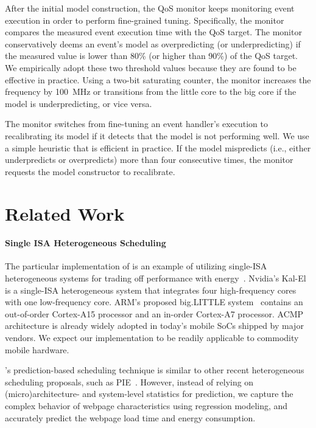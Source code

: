 After the initial model construction, the QoS monitor keeps monitoring event execution in order to perform fine-grained tuning. Specifically, the monitor compares the measured event execution time with the QoS target. The monitor conservatively deems an event's model as overpredicting (or underpredicting) if the measured value is lower than 80\% (or higher than 90\%) of the QoS target. We empirically adopt these two threshold values because they are found to be effective in practice. Using a two-bit saturating counter, the monitor increases the frequency by 100~MHz or transitions from the little core to the big core if the model is underpredicting, or vice versa.

The monitor switches from fine-tuning an event handler's execution to recalibrating its model if it detects that the model is not performing well. We use a simple heuristic that is efficient in practice. If the model mispredicts (i.e., either underpredicts or overpredicts) more than four consecutive times, the monitor requests the model constructor to recalibrate.

\section{Related Work}
\label{sec:runtime:related}

\paragraph{Single ISA Heterogeneous Scheduling} The particular implementation of \webrt is an example of utilizing single-ISA heterogeneous systems for trading off performance with energy~\cite{single-ISA}. Nvidia's Kal-El~\cite{Tegra3} is a single-ISA heterogeneous system that integrates four high-frequency cores with one low-frequency core. ARM's proposed big.LITTLE system~\cite{big.little} contains an out-of-order Cortex-A15 processor and an in-order Cortex-A7 processor. ACMP architecture is already widely adopted in today's mobile SoCs shipped by major vendors. We expect our \webrt implementation to be readily applicable to commodity mobile hardware.

\webrt's prediction-based scheduling technique is similar to other recent heterogeneous scheduling proposals, such as PIE~\cite{PIE}. However, instead of relying on (micro)architecture- and system-level statistics for prediction, we capture the complex behavior of webpage characteristics using regression modeling, and accurately predict the webpage load time and energy consumption.

